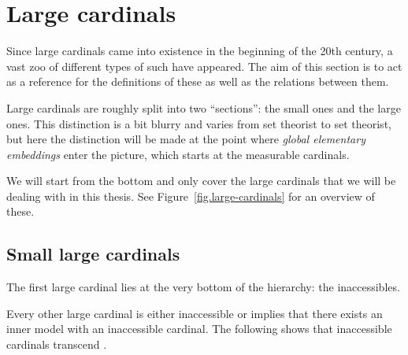 \documentclass[../../main]{subfiles}
\begin{document}


\section{Large cardinals}
\label{prelims.large-cardinals}

Since large cardinals came into existence in the beginning of the 20th century, a vast zoo of different types of such have appeared. The aim of this section is to act as a reference for the definitions of these as well as the relations between them.

\qquad Large cardinals are roughly split into two ``sections'': the small ones and the large ones. This distinction is a bit blurry and varies from set theorist to set theorist, but here the distinction will be made at the point where \textit{global elementary embeddings} enter the picture, which starts at the measurable cardinals.

\qquad We will start from the bottom and only cover the large cardinals that we will be dealing with in this thesis. See Figure~\ref{fig.large-cardinals} for an overview of these.

\subsection{Small large cardinals}

The first large cardinal lies at the very bottom of the hierarchy: the inaccessibles.


Every other large cardinal is either inaccessible or implies that there exists an inner model with an inaccessible cardinal. The following shows that inaccessible cardinals transcend \zfc.

\end{document}
